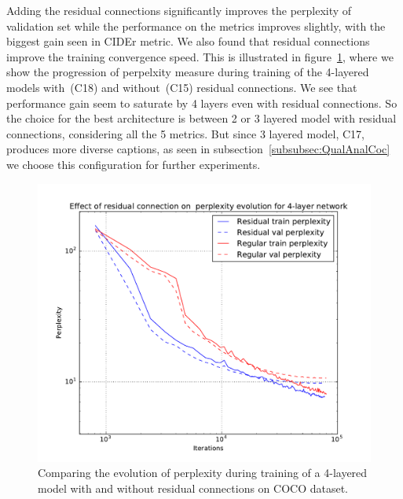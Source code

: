 Adding the residual connections significantly improves the perplexity of
validation set while the performance on the metrics improves slightly, with the
biggest gain seen in CIDEr metric.
We also found that residual connections improve the training convergence speed.
This is illustrated in figure~\ref{fig:ResVsReg}, where we show the
progression of perpelxity measure during training of the 4-layered models
with~(C18) and without~(C15) residual connections.
We see that performance gain seem to saturate by 4 layers even with residual
connections.
So the choice for the best architecture is between 2 or 3 layered model with
residual connections, considering all the 5 metrics.
But since 3 layered model, C17, produces more diverse captions, as seen in
subsection~\ref{subsubsec:QualAnalCoc} we choose this configuration for further
experiments.
\begin{figure}[t]
\begin{center}
  \includegraphics[width=0.7\linewidth]{images/ResidualVsRegPerplex.pdf}
\end{center}
\vspace*{-10mm}
\caption{Comparing the evolution of perplexity during training of a 4-layered
        model with and without residual connections on COCO dataset.}
\label{fig:ResVsReg}
\end{figure}

